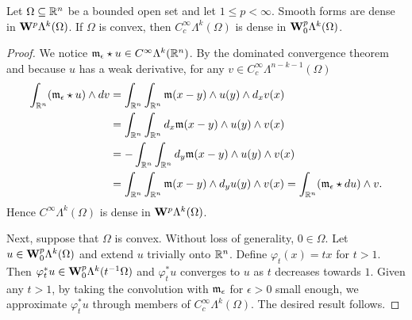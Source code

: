 \documentclass[12pt,a4paper]{article}
\begin{document}
\begin{lemma}
    Let $\Omega \subseteq {\mathbb R}^{n}$ be a bounded open set and let $1 \leq p < \infty$. 
    Smooth forms are dense in ${\mathbf W}^{p}\Lambda^{k}(\Omega)$.
    If $\Omega$ is convex, then $C^{\infty}_{c}\Lambda^{k}(\Omega)$ is dense in ${\mathbf W}^{p}_{0}\Lambda^{k}(\Omega)$.
\end{lemma}
\begin{proof}
    We notice ${\mathfrak m}_{\epsilon} \star u \in C^{\infty}\Lambda^{k}({\mathbb R}^{n})$. 
    By the dominated convergence theorem and because $u$ has a weak derivative,
    for any $v \in C^{\infty}_{c}\Lambda^{n-k-1}(\Omega)$
    \begin{align*}
        \int_{{\mathbb R}^{n}} ( {\mathfrak m}_{\epsilon} \star u ) \wedge d v
        &= 
        \int_{{\mathbb R}^{n}} \int_{{\mathbb R}^{n}} {\mathfrak m}(x-y) \wedge u(y) \wedge d_{x} v(x)
        \\&= 
        \int_{{\mathbb R}^{n}} \int_{{\mathbb R}^{n}} d_x{\mathfrak m}(x-y) \wedge u(y) \wedge v(x)
        \\&= 
        - \int_{{\mathbb R}^{n}} \int_{{\mathbb R}^{n}} d_y{\mathfrak m}(x-y) \wedge u(y) \wedge v(x)
        \\&= 
        \int_{{\mathbb R}^{n}} \int_{{\mathbb R}^{n}} {\mathfrak m}(x-y) \wedge d_y u(y) \wedge v(x)
        = 
        \int_{{\mathbb R}^{n}} ( {\mathfrak m}_{\epsilon} \star d u ) \wedge v
        .
    \end{align*}
    Hence $C^{\infty}\Lambda^{k}(\Omega)$ is dense in ${\mathbf W}^{p}\Lambda^{k}(\Omega)$.
    
    Next, suppose that $\Omega$ is convex. Without loss of generality, $0 \in \Omega$. 
    Let $u \in {\mathbf W}^{p}_{0}\Lambda^{k}(\Omega)$ and extend $u$ trivially onto ${\mathbb R}^{n}$. 
    Define $\varphi_t(x) = tx$ for $t > 1$. 
    Then $\varphi_{t}^{\ast} u \in {\mathbf W}^{p}_{0}\Lambda^{k}(t^{-1}\Omega)$ 
    and $\varphi_{t}^{\ast} u$ converges to $u$ as $t$ decreases towards $1$. 
    Given any $t > 1$, by taking the convolution with ${\mathfrak m}_{\epsilon}$ for $\epsilon > 0$ small enough,
    we approximate $\varphi_{t}^{\ast} u$ through members of $C^{\infty}_{c}\Lambda^{k}(\Omega)$.
    The desired result follows. 
\end{proof}
\end{document}
